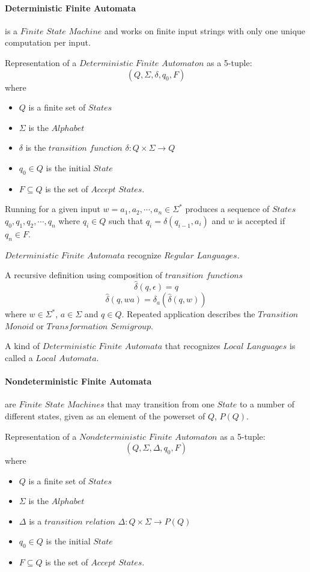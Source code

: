 \documentclass{article}
\begin{document}
    \paragraph{Deterministic Finite Automata} is a $Finite$ $State$
    $Machine$ and works on finite input strings with only one unique
    computation per input.

    Representation of a $Deterministic$ $Finite$ $Automaton$ as a 5-tuple:
    \[
        (Q,\Sigma,\delta,q_0,F)
    \]
    where
    \begin{itemize}
    \item $Q$ is a finite set of $States$
    \item $\Sigma$ is the $Alphabet$
    \item $\delta$ is the $transition$ $function$ $\delta: Q \times
      \Sigma \rightarrow Q$
    \item $q_0 \in Q$ is the initial $State$
    \item $F \subseteq Q$ is the set of $Accept$ $States$.
    \end{itemize}

    Running for a given input $w = a_1,a_2, \cdots , a_n \in \Sigma^*$
    produces a sequence of $States$ $q_0,q_1,q_2,\cdots , q_n$ where
    $q_i \in Q$ such that $q_i = \delta (q_{i-1},a_i)$ and $w$ is
    accepted if $q_n \in F$.

    $Deterministic$ $Finite$ $Automata$ recognize $Regular$ $Languages$.

    A recursive definition using composition of $transition$ $functions$
    \[
        \widehat{\delta}(q,\epsilon) = q
    \]\[
        \widehat{\delta}(q,wa) = \delta_a(\widehat{\delta}(q,w))
    \]
    where $w \in \Sigma^*$, $a \in \Sigma$ and $q \in Q$. Repeated
    application describes the $Transition$ $Monoid$ or
    $Transformation$ $Semigroup$.

    A kind of $Deterministic$ $Finite$ $Automata$ that recognizes
    $Local$ $Languages$ is called a $Local$ $Automata$.

    \paragraph{Nondeterministic Finite Automata} are $Finite$ $State$
    $Machines$ that may transition from one $State$ to a number of
    different states, given as an element of the powerset of $Q$,
    $P(Q)$.

    Representation of a $Nondeterministic$ $Finite$ $Automaton$ as a 5-tuple:
    \[
        (Q,\Sigma,\Delta,q_0,F)
    \]
    where
    \begin{itemize}
    \item $Q$ is a finite set of $States$
    \item $\Sigma$ is the $Alphabet$
    \item $\Delta$ is a $transition$ $relation$ $\Delta: Q \times
      \Sigma \rightarrow P(Q)$
    \item $q_0 \in Q$ is the initial $State$
    \item $F \subseteq Q$ is the set of $Accept$ $States$.
    \end{itemize}
\end{document}
